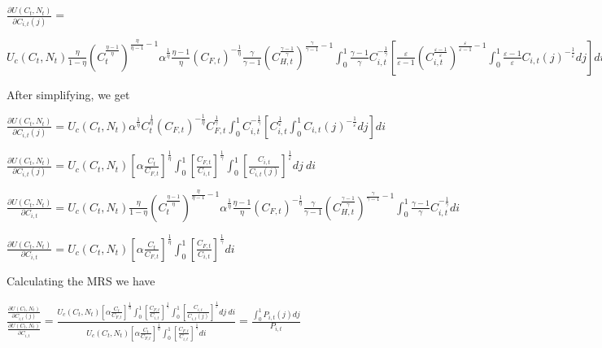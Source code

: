 \documentclass[
]{article}
\begin{document}
\(\displaystyle \frac{\partial U(C_t,N_t)}{\partial C_{i,t}(j)} =\)

\(\displaystyle U_c(C_t,N_t)\frac{\eta}{1-\eta}\left( C_t^{\frac{\eta-1}{\eta}} \right)^{\frac{\eta}{\eta-1}-1} \alpha^{\frac{1}{\eta}}\frac{\eta-1}{\eta}\left( C_{F,t}\right)^{-\frac{1}{\eta}}\frac{\gamma}{\gamma-1}\left(C_{H,t}^{\frac{\gamma-1}{\gamma}} \right)^{\frac{\gamma}{\gamma-1}-1}\int_0^1 \frac{\gamma-1}{\gamma} C_{i,t}^{-\frac{1}{\gamma}}\left[ \frac{\varepsilon}{\varepsilon-1}\left(C_{i,t}^{\frac{\varepsilon-1}{\varepsilon}} \right)^{\frac{\varepsilon}{\varepsilon-1}-1}\int_0^1 \frac{\varepsilon-1}{\varepsilon} C_{i,t}(j)^{-\frac{1}{\varepsilon}}dj \right]di\)

After simplifying, we get

\(\displaystyle \frac{\partial U(C_t,N_t)}{\partial C_{i,t}(j)} = U_c(C_t,N_t) \alpha^{\frac{1}{\eta}} C_t^{\frac{1}{\eta}}\left( C_{F,t}\right)^{-\frac{1}{\eta}}C_{F,t}^{\frac{1}{\gamma}} \int_0^1 C_{i,t}^{-\frac{1}{\gamma}} \left[ C_{i,t}^\frac{1}{\varepsilon} \int_0^1 C_{i,t}(j)^{-\frac{1}{\varepsilon}}dj \right] di\)

\(\displaystyle \frac{\partial U(C_t,N_t)}{\partial C_{i,t}(j)} = U_c(C_t,N_t) \left[ \alpha \frac{C_t}{C_{F,t}} \right]^{\frac{1}{\eta}} \int_0^1 \left[\frac{C_{F,t}}{C_{i,t}}\right]^{\frac{1}{\gamma}} \int_0^1 \left[\frac{C_{i,t}}{C_{i,t}(j)}\right]^{\frac{1}{\varepsilon}}dj \ di\)

\(\displaystyle \frac{\partial U(C_t,N_t)}{\partial C_{i,t}} = U_c(C_t,N_t)\frac{\eta}{1-\eta}\left( C_t^{\frac{\eta-1}{\eta}} \right)^{\frac{\eta}{\eta-1}-1} \alpha^{\frac{1}{\eta}}\frac{\eta-1}{\eta}\left( C_{F,t}\right)^{-\frac{1}{\eta}}\frac{\gamma}{\gamma-1}\left(C_{H,t}^{\frac{\gamma-1}{\gamma}} \right)^{\frac{\gamma}{\gamma-1}-1}\int_0^1 \frac{\gamma-1}{\gamma} C_{i,t}^{-\frac{1}{\gamma}}di\)

\(\displaystyle \frac{\partial U(C_t,N_t)}{\partial C_{i,t}} = U_c(C_t,N_t) \left[ \alpha \frac{C_t}{C_{F,t}} \right]^{\frac{1}{\eta}} \int_0^1 \left[\frac{C_{F,t}}{C_{i,t}}\right]^{\frac{1}{\gamma}} di\)

Calculating the MRS we have

\(\displaystyle \frac{\displaystyle \frac{\partial U(C_t,N_t)}{\displaystyle \partial C_{i,t}(j)}}{\frac{\displaystyle \partial U(C_t,N_t)}{\displaystyle \partial C_{i,t}}} = \frac{\displaystyle U_c(C_t,N_t) \left[ \alpha \frac{C_t}{C_{F,t}} \right]^{\frac{1}{\eta}} \int_0^1 \left[\frac{C_{F,t}}{C_{i,t}}\right]^{\frac{1}{\gamma}} \int_0^1 \left[\frac{C_{i,t}}{C_{i,t}(j)}\right]^{\frac{1}{\varepsilon}}dj \ di }{\displaystyle U_c(C_t,N_t) \left[ \alpha \frac{C_t}{C_{F,t}} \right]^{\frac{1}{\eta}} \int_0^1 \left[\frac{C_{F,t}}{C_{i,t}}\right]^{\frac{1}{\gamma}} di} = \frac{\displaystyle \int_0^1P_{i,t}(j)dj}{P_{i,t}}\)
\end{document}
